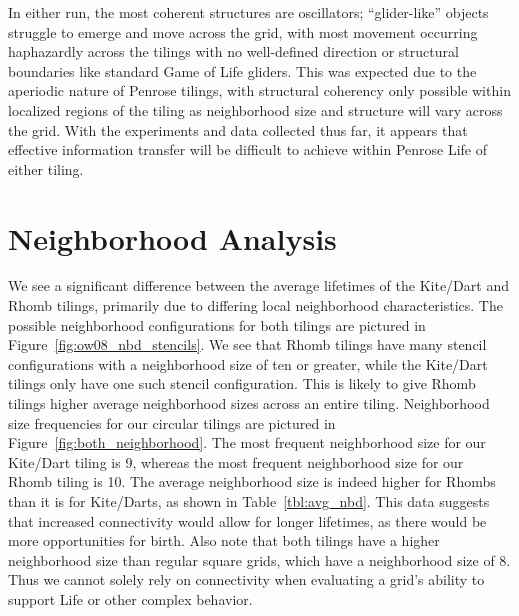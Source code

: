 \documentclass[a4paper,11pt,twoside]{report}
\begin{document}
In either run, the most coherent structures are oscillators; ``glider-like'' objects struggle to emerge and move across the grid, with most movement occurring haphazardly across the tilings with no well-defined direction or structural boundaries like standard Game of Life gliders. This was expected due to the aperiodic nature of Penrose tilings, with structural coherency only possible within localized regions of the tiling as neighborhood size and structure will vary across the grid. With the experiments and data collected thus far, it appears that effective information transfer will be difficult to achieve within Penrose Life of either tiling.

\section{Neighborhood Analysis}
\label{sec:ch4_neighbors}

We see a significant difference between the average lifetimes of the Kite/Dart and Rhomb tilings, primarily due to differing local neighborhood characteristics. The possible neighborhood configurations for both tilings are pictured in Figure~\ref{fig:ow08_nbd_stencils}. We see that Rhomb tilings have many stencil configurations with a neighborhood size of ten or greater, while the Kite/Dart tilings only have one such stencil configuration. This is likely to give Rhomb tilings higher average neighborhood sizes across an entire tiling. Neighborhood size frequencies for our circular tilings are pictured in Figure~\ref{fig:both_neighborhood}. The most frequent neighborhood size for our Kite/Dart tiling is 9, whereas the most frequent neighborhood size for our Rhomb tiling is 10. The average neighborhood size is indeed higher for Rhombs than it is for Kite/Darts, as shown in Table~\ref{tbl:avg_nbd}. This data suggests that increased connectivity would allow for longer lifetimes, as there would be more opportunities for birth. Also note that both tilings have a higher neighborhood size than regular square grids, which have a neighborhood size of 8. Thus we cannot solely rely on connectivity when evaluating a grid's ability to support Life or other complex behavior. 
\end{document}
